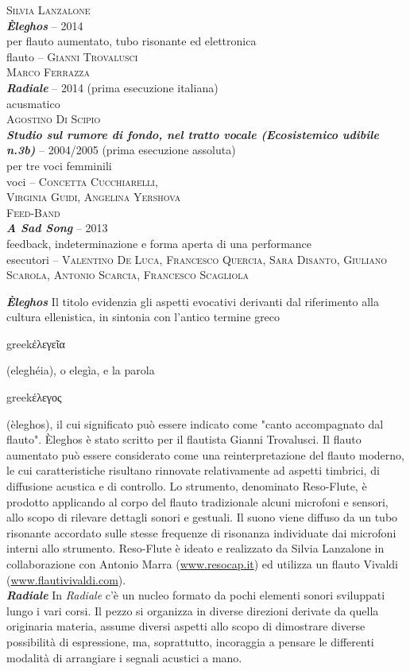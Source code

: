 \documentclass[8pt, twoside, a5paper]{extreport}
\newcommand{\greco}[1]{%
\begin{otherlanguage*}{greek}#1\end{otherlanguage*}}
\newcommand{\brano}[6]{%
\noindent \textsc{#1}\\ %
\noindent \textbf{\textit{#2}} -- #3\\%
\noindent #4\\ %
\noindent #5 -- \textsc{#6}%
\\
}%
\newcommand{\installazione}[4]{%
\noindent \textsc{#1}\\ %
\noindent \textbf{\textit{#2}} -- #3\\%
\noindent #4%
\\
}%
\newcommand{\descrizione}[2]{%
\noindent \textbf{\textit{#1}} %
#2 %
\\
}%
\begin{document}
\begin{multicols}{2}

\brano{Silvia Lanzalone}
{Èleghos}{2014}
{per flauto aumentato, tubo risonante ed elettronica}
{flauto}{Gianni Trovalusci}

\installazione{Marco Ferrazza}
{Radiale}{2014 (prima esecuzione italiana)}
{acusmatico}

\brano{Agostino Di Scipio}
{Studio sul rumore di fondo, nel tratto vocale (Ecosistemico udibile n.3b)}{2004/2005 (prima esecuzione assoluta)}
{per tre voci femminili}
{voci}{Concetta Cucchiarelli, \\Virginia Guidi, Angelina Yershova}

\brano{Feed-Band} %
{A Sad Song}{2013}
{feedback, indeterminazione e forma aperta di una performance}
{esecutori}{Valentino De Luca, Francesco Quercia, Sara Disanto, Giuliano Scarola, Antonio Scarcia, Francesco Scagliola}


\vspace{.5cm}

\descrizione{Èleghos}{Il titolo evidenzia gli aspetti evocativi derivanti dal riferimento alla cultura ellenistica, in sintonia con l’antico termine greco \greco{ἐλεγεῖα} (eleghéia), o elegìa, e la parola \greco{έλεγος} (èleghos), il cui significato può essere indicato come "canto accompagnato dal flauto". Èleghos è stato scritto per il flautista Gianni Trovalusci.
Il flauto aumentato può essere considerato come una reinterpretazione del flauto moderno, le cui caratteristiche risultano rinnovate relativamente ad aspetti timbrici, di diffusione acustica e di controllo. Lo strumento, denominato Reso-Flute, è prodotto applicando al corpo del flauto tradizionale alcuni microfoni e sensori, allo scopo di rilevare dettagli sonori e gestuali. Il suono viene diffuso da un tubo risonante accordato sulle stesse frequenze di risonanza individuate dai microfoni interni allo strumento.
Reso-Flute è ideato e realizzato da Silvia Lanzalone in collaborazione con Antonio Marra (\href{http://www.resocap.it/}{www.resocap.it}) ed utilizza un flauto Vivaldi (\href{http://www.flautivivaldi.com/}{www.flautivivaldi.com}).}


\descrizione{Radiale}{In \textit{Radiale} c'è un nucleo formato da pochi elementi sonori sviluppati lungo i vari corsi. Il pezzo si organizza in diverse direzioni derivate da quella originaria materia, assume diversi aspetti allo scopo di dimostrare diverse possibilità di espressione, ma, soprattutto, incoraggia a pensare le differenti modalità di arrangiare i segnali acustici a mano.}



\end{multicols}
\end{document}
